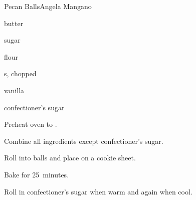 \begin{recipe}{Pecan Balls}{Angela Mangano}{}

\begin{ingredients}
\item \lbs{\half} butter
\item {} sugar
\item {} flour
\item {} s, chopped
\item {} vanilla
\item confectioner's sugar
\end{ingredients}

\begin{directions}
\item Preheat oven to .
\item Combine all ingredients except confectioner's sugar.
\item Roll into balls and place on a cookie sheet.
\item Bake for 25~minutes.
\item Roll in confectioner's sugar when warm and again when cool.
\end{directions}

\end{recipe}
